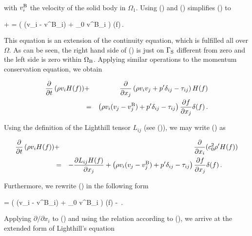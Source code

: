 \documentclass[a4paper,10pt]{article}
\begin{document}
\noindent
with $v^{\rm  B}_i$ the  velocity of the  solid body in  $\Omega_1$. Using
() and () simplifies () to

+  
= \left( \rho (v_i - v^{\rm B}_i) + \rho_0 v^{\rm B}_i \right)  \delta(f)\,.
\ee

\noindent
This  equation  is an  extension  of  the  continuity equation,  which  is
fulfilled  all over  $\Omega$. As  can  be seen,  the right  hand side  of
() is just on $\Gamma_{\rm S}$ different from zero and the left
side is zero within $\Omega_{\rm  B}$.  Applying similar operations to the
momentum conservation equation, we obtain

\begin{eqnarray}
\label{eq:eLmo1}
\frac{\partial}{\partial t} \left( \rho v_i H(f) \right)
&+& \frac{\partial}{\partial x_j} \left( \rho v_i v_j +
  p'\delta_{ij}
- \tau_{ij} \right) H(f)\nonumber \\
&=&
\left( \rho v_i (v_j - v^{\rm B}_j) + p' \delta_{ij}- \tau_{ij} \right) 
\frac{\partial f}{\partial x_j} \delta(f)\,.
\end{eqnarray}

\noindent
Using the  definition of the Lighthill tensor  $L_{ij}$ (see ()),
we may write () as

\begin{eqnarray}
\label{eq:eLmo2}
\frac{\partial}{\partial t} \left( \rho v_i H(f) \right)
&+& \frac{\partial }{\partial x_i} (c_0^2 \rho' H(f)) \nonumber \\
&=& -\frac{\partial L_{ij} H(f)}{\partial x_j} 
 +\left( \rho v_i (v_j - v^{\rm B}_j) + p' \delta_{ij}- \tau_{ij} \right) 
\frac{\partial f}{\partial x_j} \delta(f)\,. \ \ \ \ \ \ \ 
\end{eqnarray}

\noindent
Furthermore, we rewrite ()  in the following form

 = \left( \rho (v_i - v^{\rm B}_i) + \rho_0 v^{\rm B}_i \right) \frac{\partial f}{\partial
  x_i} \delta(f) 
-   \,.
\ee

\noindent
Applying $\partial /\partial x_i$  to () and using the relation
according to (\eqnref{eLce1r}), we arrive at the extended form of Lighthill's
equation
\end{document}
